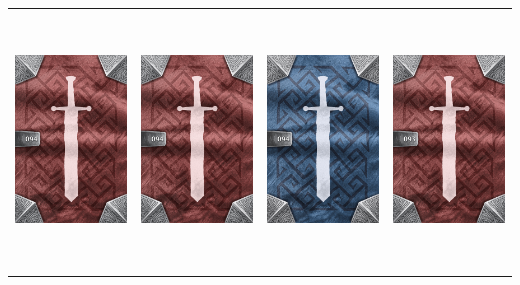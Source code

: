 \documentclass{minimal}
\begin{document}
{\begin{longtable}{llll}
\includegraphics[width=44mm,height=68mm]{./64-151/gh-094b-scroll-of-healing-back.png} &
\includegraphics[width=44mm,height=68mm]{./64-151/gh-094b-scroll-of-healing-back.png} &
\includegraphics[width=44mm,height=68mm]{./64-151/gh-094a-scroll-of-healing-back.png} &
\includegraphics[width=44mm,height=68mm]{./64-151/gh-093b-scroll-of-power-back.png}\\ 

\end{longtable}}
\end{document}
